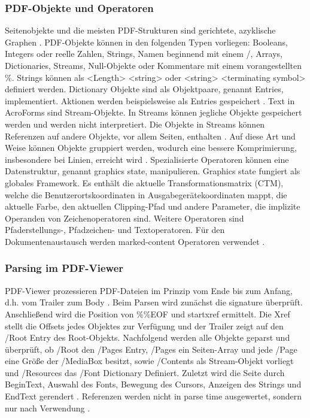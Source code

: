\subsubsection{PDF-Objekte und Operatoren}
Seitenobjekte und die meisten PDF-Strukturen sind gerichtete, azyklische Graphen \cite{ccc-wtf-pdf}. PDF-Objekte können in den folgenden Typen vorliegen: Booleans, Integers oder reelle Zahlen, Strings, Namen beginnend mit einem /, Arrays, Dictionaries, Streams, Null-Objekte oder Kommentare mit einem vorangestellten \%. Strings können als <Length> <string> oder <string> <terminating symbol> definiert werden. Dictionary Objekte sind als Objektpaare, genannt Entries, implementiert. Aktionen werden beispielsweise als Entries gespeichert \cite{ccc-badpdf}. Text in AcroForms sind Stream-Objekte. In Streams können jegliche Objekte gespeichert werden und werden nicht interpretiert. Die Objekte in Streams können Referenzen auf andere Objekte, vor allem Seiten, enthalten \cite{ccc-break-pdf}. Auf diese Art und Weise können Objekte gruppiert werden, wodurch eine bessere Komprimierung, insbesondere bei Linien, erreicht wird \cite{schneeberger}. Spezialisierte Operatoren können eine Datenstruktur, genannt graphics state, manipulieren. Graphics state fungiert als globales Framework. Es enthält die aktuelle Transformationsmatrix (CTM), welche die Benutzerortskoordinaten in Ausgabegerätekoordinaten mappt, die aktuelle Farbe, den aktuellen Clipping-Pfad und andere Parameter, die implizite Operanden von Zeichenoperatoren sind. Weitere Operatoren sind Pfaderstellungs-, Pfadzeichen- und Textoperatoren. Für den Dokumentenaustausch werden marked-content Operatoren verwendet \cite{fileformat}. 

\subsubsection{Parsing im PDF-Viewer}
PDF-Viewer prozessieren PDF-Dateien im Prinzip vom Ende bis zum Anfang, d.h. vom Trailer zum Body \cite{ccc-break-pdf}. Beim Parsen wird zunächst die signature überprüft. Anschließend wird die Position von \%\%EOF und startxref ermittelt. Die Xref stellt die Offsets jedes Objektes zur Verfügung und der Trailer zeigt auf den /Root Entry des Root-Objekts. Nachfolgend werden alle Objekte geparst und überprüft, ob /Root den /Pages Entry, /Pages ein Seiten-Array und jede /Page eine Größe der /MediaBox besitzt, sowie /Contents als Stream-Objekt vorliegt und /Resources das /Font Dictionary Definiert. Zuletzt wird die Seite durch BeginText, Auswahl des Fonts, Bewegung des Cursors, Anzeigen des Strings und EndText gerendert \cite{ccc-pdf-secrets}. Referenzen werden nicht in parse time ausgewertet, sondern nur nach Verwendung \cite{ccc-wtf-pdf}. 

